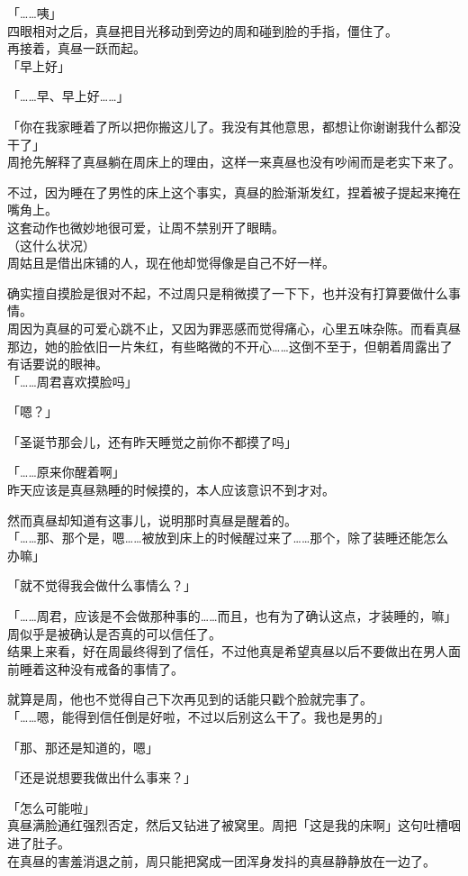 「……咦」\\

四眼相对之后，真昼把目光移动到旁边的周和碰到脸的手指，僵住了。\\

再接着，真昼一跃而起。\\

「早上好」

「……早、早上好……」

「你在我家睡着了所以把你搬这儿了。我没有其他意思，都想让你谢谢我什么都没干了」\\

周抢先解释了真昼躺在周床上的理由，这样一来真昼也没有吵闹而是老实下来了。

不过，因为睡在了男性的床上这个事实，真昼的脸渐渐发红，捏着被子提起来掩在嘴角上。\\

这套动作也微妙地很可爱，让周不禁别开了眼睛。\\

（这什么状况）\\

周姑且是借出床铺的人，现在他却觉得像是自己不好一样。

确实擅自摸脸是很对不起，不过周只是稍微摸了一下下，也并没有打算要做什么事情。\\

周因为真昼的可爱心跳不止，又因为罪恶感而觉得痛心，心里五味杂陈。而看真昼那边，她的脸依旧一片朱红，有些略微的不开心……这倒不至于，但朝着周露出了有话要说的眼神。\\

「……周君喜欢摸脸吗」

「嗯？」

「圣诞节那会儿，还有昨天睡觉之前你不都摸了吗」

「……原来你醒着啊」\\

昨天应该是真昼熟睡的时候摸的，本人应该意识不到才对。

然而真昼却知道有这事儿，说明那时真昼是醒着的。\\

「……那、那个是，嗯……被放到床上的时候醒过来了……那个，除了装睡还能怎么办嘛」

「就不觉得我会做什么事情么？」

「……周君，应该是不会做那种事的……而且，也有为了确认这点，才装睡的，嘛」\\

周似乎是被确认是否真的可以信任了。\\

结果上来看，好在周最终得到了信任，不过他真是希望真昼以后不要做出在男人面前睡着这种没有戒备的事情了。

就算是周，他也不觉得自己下次再见到的话能只戳个脸就完事了。\\

「……嗯，能得到信任倒是好啦，不过以后别这么干了。我也是男的」

「那、那还是知道的，嗯」

「还是说想要我做出什么事来？」

「怎么可能啦」\\

真昼满脸通红强烈否定，然后又钻进了被窝里。周把「这是我的床啊」这句吐槽咽进了肚子。\\

在真昼的害羞消退之前，周只能把窝成一团浑身发抖的真昼静静放在一边了。
